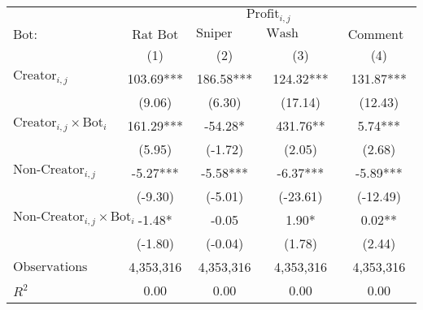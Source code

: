 \begin{tabular}{lcccc}
\toprule
 & \multicolumn{4}{c}{$\text{Profit}_{i,j}$} \\
\cline{2-5}
 $\text{Bot}:$ & $\text{Rat Bot}$ & $\text{Sniper Bot}$ & $\text{Wash Trading Bot}$ & $\text{Comment Bot}$ \\
 & (1) & (2) & (3) & (4)\\
\midrule
$\text{Creator}_{i,j}$ & 103.69*** & 186.58*** & 124.32*** & 131.87*** \\
 & (9.06) & (6.30) & (17.14) & (12.43) \\
$\text{Creator}_{i,j} \times \text{Bot}_i$ & 161.29*** & -54.28* & 431.76** & 5.74*** \\
 & (5.95) & (-1.72) & (2.05) & (2.68) \\
$\text{Non-Creator}_{i,j}$ & -5.27*** & -5.58*** & -6.37*** & -5.89*** \\
 & (-9.30) & (-5.01) & (-23.61) & (-12.49) \\
$\text{Non-Creator}_{i,j} \times \text{Bot}_i$ & -1.48* & -0.05 & 1.90* & 0.02** \\
 & (-1.80) & (-0.04) & (1.78) & (2.44) \\
\midrule
$\text{Observations}$ & 4,353,316 & 4,353,316 & 4,353,316 & 4,353,316 \\
$R^2$ & 0.00 & 0.00 & 0.00 & 0.00 \\
\bottomrule
\end{tabular}